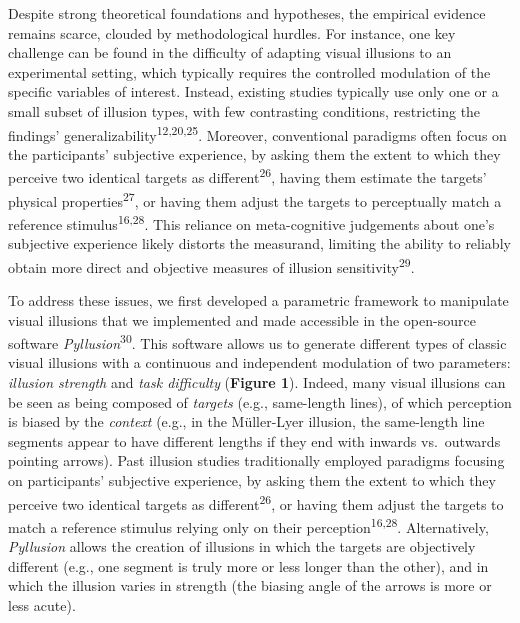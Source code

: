 \documentclass[
  man,floatsintext]{apa6}
\begin{document}
Despite strong theoretical foundations and hypotheses, the empirical evidence remains scarce, clouded by methodological hurdles. For instance, one key challenge can be found in the difficulty of adapting visual illusions to an experimental setting, which typically requires the controlled modulation of the specific variables of interest. Instead, existing studies typically use only one or a small subset of illusion types, with few contrasting conditions, restricting the findings' generalizability\textsuperscript{12,20,25}. Moreover, conventional paradigms often focus on the participants' subjective experience, by asking them the extent to which they perceive two identical targets as different\textsuperscript{26}, having them estimate the targets' physical properties\textsuperscript{27}, or having them adjust the targets to perceptually match a reference stimulus\textsuperscript{16,28}. This reliance on meta-cognitive judgements about one's subjective experience likely distorts the measurand, limiting the ability to reliably obtain more direct and objective measures of illusion sensitivity\textsuperscript{29}.

To address these issues, we first developed a parametric framework to manipulate visual illusions that we implemented and made accessible in the open-source software \emph{Pyllusion}\textsuperscript{30}. This software allows us to generate different types of classic visual illusions with a continuous and independent modulation of two parameters: \emph{illusion strength} and \emph{task difficulty} (\textbf{Figure 1}). Indeed, many visual illusions can be seen as being composed of \emph{targets} (e.g., same-length lines), of which perception is biased by the \emph{context} (e.g., in the Müller-Lyer illusion, the same-length line segments appear to have different lengths if they end with inwards vs.~outwards pointing arrows). Past illusion studies traditionally employed paradigms focusing on participants' subjective experience, by asking them the extent to which they perceive two identical targets as different\textsuperscript{26}, or having them adjust the targets to match a reference stimulus relying only on their perception\textsuperscript{16,28}. Alternatively, \emph{Pyllusion} allows the creation of illusions in which the targets are objectively different (e.g., one segment is truly more or less longer than the other), and in which the illusion varies in strength (the biasing angle of the arrows is more or less acute).
\end{document}
